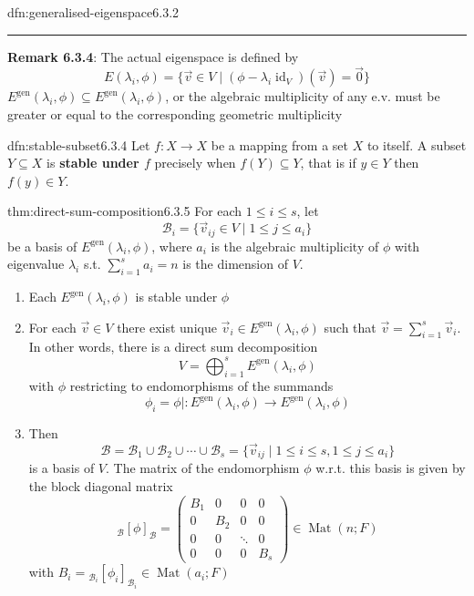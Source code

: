 \documentclass[landscape, 8pt]{extarticle}
\DeclareMathOperator{\Mat}{Mat}
\DeclareMathOperator{\id}{id}
\begin{document}
\begin{multicols}{3}
\begin{dfn}{dfn:generalised-eigenspace}{6.3.2}
    \noindent\rule{\textwidth}{0.2pt}
    \textbf{Remark 6.3.4}: The actual eigenspace is defined by
    \[E(\lambda_{i}, \phi) = \{\vec{v}\in V \mid (\phi - \lambda_{i} \id_{V}) (\vec{v}) = \vec{0}\}\]
    $E^{\text{gen}}(\lambda_{i}, \phi) \subseteq E^{\text{gen}}(\lambda_{i}, \phi)$, or the algebraic multiplicity of any e.v. must be greater or equal to the corresponding geometric multiplicity


\end{dfn}

\begin{dfn}{dfn:stable-subset}{6.3.4}
    Let $f : X \to X$ be a mapping from a set $X$ to itself. A subset $Y \subseteq X$ is \textbf{stable under $f$} precisely when $f(Y) \subseteq Y$, that is if $y\in Y$ then $f(y)\in Y$.
\end{dfn}

\begin{thm}{thm:direct-sum-composition}{6.3.5}
    For each $1 \le i \le s$, let 
    \[\mathcal{B}_{i} = \{\vec{v}_{ij}\in V \mid 1 \le j \le a_{i}\}\]
    be a basis of $E^{\text{gen}}(\lambda_{i}, \phi)$, where $a_i$ is the algebraic multiplicity of $\phi$ with eigenvalue $\lambda_{i}$ s.t. $\sum_{i = 1}^{s} a_{i} = n$ is the dimension of $V$.
    \begin{enumerate}
        \setlength\itemsep{0em}
        \item Each $E^{\text{gen}}(\lambda_{i}, \phi)$ is stable under $\phi$
        \item For each $\vec{v}\in V$ there exist unique $\vec{v}_{i}\in E^{\text{gen}}(\lambda_{i}, \phi)$ such that $\vec{v} = \sum_{i = 1}^{s} \vec{v}_{i}$. In other words, there is a direct sum decomposition
            \[V = \bigoplus_{i = 1}^{s} E^{\text{gen}}(\lambda_{i}, \phi)\]
            with $\phi$ restricting to endomorphisms of the summands
            \[\phi_{i} = \phi \rvert : E^{\text{gen}}(\lambda_{i}, \phi) \to E^{\text{gen}}(\lambda_{i}, \phi)\]
        \item Then
            \[\mathcal{B} = \mathcal{B}_{1} \cup\mathcal{B}_{2} \cup \cdots \cup \mathcal{B}_{s} = \{\vec{v}_{ij} \mid 1 \le i \le s, 1 \le j \le a_{i}\} \]
            is a basis of $V$. The matrix of the endomorphism $\phi$ w.r.t. this basis is given by the block diagonal matrix
            \[{}_{\mathcal{B}}[\phi]_{\mathcal{B}} = \left(\begin{array}{c|c|c|c}
                B_{1} & 0 & 0 & 0 \\
                \hline
                0 & B_{2} & 0 & 0 \\
                \hline
                0 & 0 & \ddots & 0 \\
                \hline
                0 & 0 & 0 & B_{s}
            \end{array}\right) \in \Mat(n ; F)\]
            with $B_{i} = {}_{\mathcal{B}_{i}}[\phi_{i}]_{\mathcal{B}_{i}} \in \Mat(a_{i}; F)$
    \end{enumerate}
\end{thm}


\end{multicols}
\end{document}
